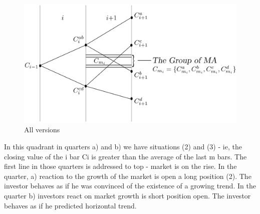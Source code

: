 \documentclass{tewiart}
\begin{document}
\begin{figure}[h]
\centering
\centering 
\includegraphics[width=\textwidth]{rysunek1pp.eps}
\caption{All versions}
\end{figure}
\FloatBarrier

In this quadrant in quarters a) and b) we have situations (2) and (3) - ie, the closing value of the i bar Ci is greater than the average of the last m bars. The first line in those quarters is addressed to top - market is on the rise. In the quarter, a) reaction to the growth of the market is open a long position (2). The investor behaves as if he was convinced of the existence of a growing trend. In the quarter b) investors react on market growth is short position open. The investor behaves as if he predicted horizontal trend.
\end{document}

